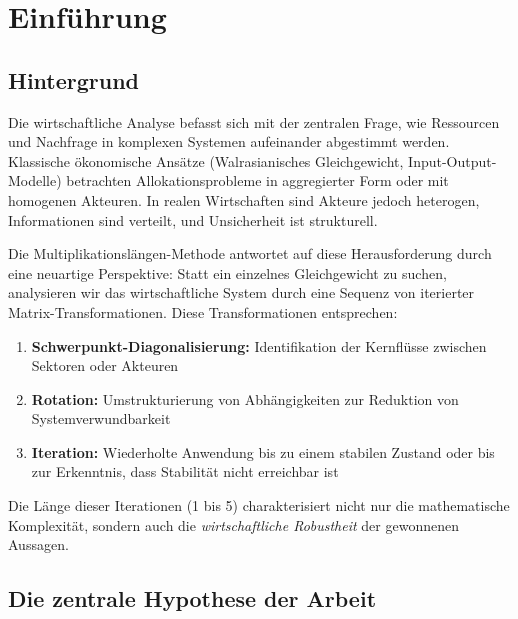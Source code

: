 \documentclass[a4paper,12pt]{article}
\theoremstyle{definition}
\begin{document}
\begin{abstract}
\textbf{Schlüsselwörter:} Multiplikationslängen-Methode, Wirtschaftliche Matrix-Transformation, Schwerpunkt-Diagonalisierung, Rotation, dezentralisierte Systeme, strukturelle Unsicherheit, Wirtschaftsstabilität, formale Wirtschaftstheorie

\end{abstract}

\tableofcontents

\newpage

\section{Einführung}

\subsection{Hintergrund}

Die wirtschaftliche Analyse befasst sich mit der zentralen Frage, wie Ressourcen und Nachfrage in komplexen Systemen aufeinander abgestimmt werden. Klassische ökonomische Ansätze (Walrasianisches Gleichgewicht, Input-Output-Modelle) betrachten Allokationsprobleme in aggregierter Form oder mit homogenen Akteuren. In realen Wirtschaften sind Akteure jedoch heterogen, Informationen sind verteilt, und Unsicherheit ist strukturell.

Die Multiplikationslängen-Methode antwortet auf diese Herausforderung durch eine neuartige Perspektive: Statt ein einzelnes Gleichgewicht zu suchen, analysieren wir das wirtschaftliche System durch eine Sequenz von iterierter Matrix-Transformationen. Diese Transformationen entsprechen:

\begin{enumerate}
\item \textbf{Schwerpunkt-Diagonalisierung:} Identifikation der Kernflüsse zwischen Sektoren oder Akteuren
\item \textbf{Rotation:} Umstrukturierung von Abhängigkeiten zur Reduktion von Systemverwundbarkeit
\item \textbf{Iteration:} Wiederholte Anwendung bis zu einem stabilen Zustand oder bis zur Erkenntnis, dass Stabilität nicht erreichbar ist
\end{enumerate}

Die Länge dieser Iterationen (1 bis 5) charakterisiert nicht nur die mathematische Komplexität, sondern auch die \emph{wirtschaftliche Robustheit} der gewonnenen Aussagen.

\subsection{Die zentrale Hypothese der Arbeit}
\end{document}
